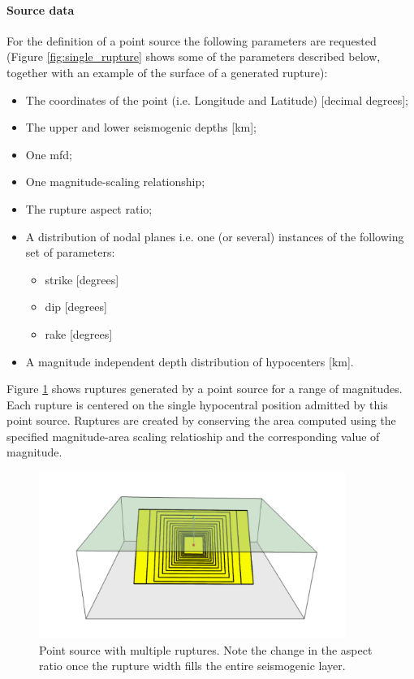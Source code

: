 \paragraph{Source data}
%
For the definition of a point source the following 
parameters are requested (Figure \ref{fig:single_rupture} shows some of 
the parameters described below, together with an example of the 
surface of a generated rupture):
\begin{itemize}
\item The coordinates of the point (i.e. Longitude and Latitude) [decimal 
    degrees];
\item The upper and lower seismogenic depths [km];
\item One \gls{mfd};
\item One magnitude-scaling relationship;
\item The rupture aspect ratio;
\item A distribution of nodal planes i.e. one (or several) instances 
    of the following set of parameters:
\begin{itemize}
    \item \gls{strike} [degrees]
    \item \gls{dip} [degrees]
    \item \gls{rake} [degrees]
\end{itemize}
\item A magnitude independent depth distribution of hypocenters [km]. 
\end{itemize}
%
Figure \ref{fig:point_source_multiple_ruptures} shows ruptures 
generated by a point source for a range of magnitudes. 
Each rupture is centered on the single hypocentral position 
admitted by this point source. 
Ruptures are created by conserving the area computed
using the specified mag\-ni\-tude-area scaling relatioship and the
corresponding value of magnitude.
\begin{figure}[ht!]
\centering
\includegraphics[width=10cm]{figures/hazard/point_source_multiple_ruptures.pdf}
\caption{Point source with multiple ruptures. Note the change in the aspect 
ratio once the rupture width fills the entire seismogenic layer.}
\label{fig:point_source_multiple_ruptures}
\end{figure}

